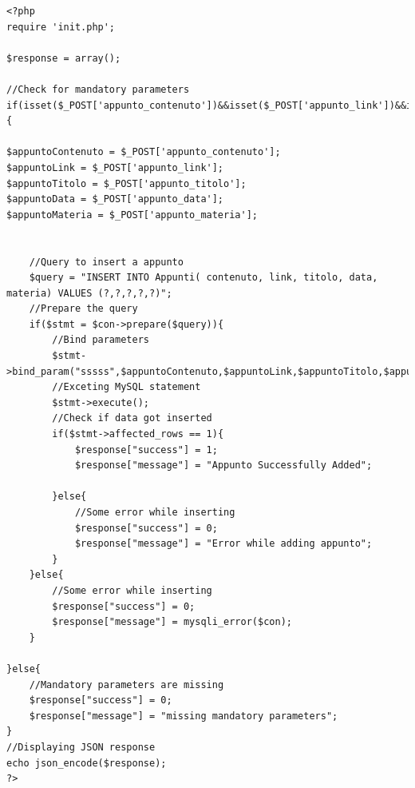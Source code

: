 \documentclass[a4paper, 50pt, twoside]{article}
\begin{document}
\begin{lstlisting}
<?php
require 'init.php';

$response = array();

//Check for mandatory parameters
if(isset($_POST['appunto_contenuto'])&&isset($_POST['appunto_link'])&&isset($_POST['appunto_titolo'])&&isset($_POST['appunto_data'])&&isset($_POST['appunto_materia'])){

$appuntoContenuto = $_POST['appunto_contenuto'];
$appuntoLink = $_POST['appunto_link'];
$appuntoTitolo = $_POST['appunto_titolo'];
$appuntoData = $_POST['appunto_data'];
$appuntoMateria = $_POST['appunto_materia'];


	//Query to insert a appunto
	$query = "INSERT INTO Appunti( contenuto, link, titolo, data, materia) VALUES (?,?,?,?,?)";
	//Prepare the query
	if($stmt = $con->prepare($query)){
		//Bind parameters
		$stmt->bind_param("sssss",$appuntoContenuto,$appuntoLink,$appuntoTitolo,$appuntoData,$appuntoMateria);
		//Exceting MySQL statement
		$stmt->execute();
		//Check if data got inserted
		if($stmt->affected_rows == 1){
			$response["success"] = 1;			
			$response["message"] = "Appunto Successfully Added";			
			
		}else{
			//Some error while inserting
			$response["success"] = 0;
			$response["message"] = "Error while adding appunto";
		}					
	}else{
		//Some error while inserting
		$response["success"] = 0;
		$response["message"] = mysqli_error($con);
	}

}else{
	//Mandatory parameters are missing
	$response["success"] = 0;
	$response["message"] = "missing mandatory parameters";
}
//Displaying JSON response
echo json_encode($response);
?>
\end{lstlisting}
\newpage
\end{document}
